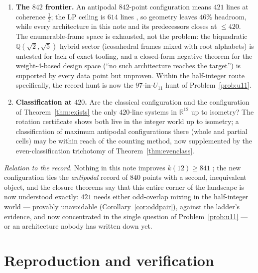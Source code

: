 \documentclass[11pt]{article}
\theoremstyle{remark}
\newcommand{\RR}{\mathbb{R}}
\newcommand{\QQ}{\mathbb{Q}}
\begin{document}
\begin{enumerate}
relaxation adapted to the $64$-per-cell-pair conflict structure that beats
the gaps of Table~\ref{tab:loose}? The barrier theorem sharpens the
question: any useful valid-inequality family must have $\ge110$-cell
positive support. The twelve star cuts are the first such family; finding
a \emph{second}, independent one (weighted stars? spectral cuts on the
$U_{11}$ quotient?) would over-determine the polytope near the witness and
might close the gap without solving Problem~\ref{prob:u11} exactly.
\item \textbf{The $842$ frontier.} An antipodal $842$-point configuration
means $421$ lines at coherence $\tfrac12$; the LP ceiling is $614$ lines
\cite{RussellLines26}, so geometry leaves $46\%$ headroom, while every
architecture in this note and its predecessors closes at $\le420$. The
enumerable-frame space is exhausted, not the problem: the biquadratic
$\QQ(\sqrt2,\sqrt5)$ hybrid sector (icosahedral frames mixed with root
alphabets) is untested for lack of exact tooling, and a closed-form
negative theorem for the weight-$4$-based design space (``no such
architecture reaches the target'') is supported by every data point but
unproven. Within the half-integer route specifically, the record hunt is
now the $97$-in-$U_{11}$ hunt of Problem~\ref{prob:u11}.
\item \textbf{Classification at $420$.} Are the classical configuration
and the configuration of Theorem~\ref{thm:exists} the only $420$-line
systems in $\RR^{12}$ up to isometry? The rotation certificate shows both
live in the integer world up to isometry; a classification of maximum
antipodal configurations there (whole and partial cells) may be within
reach of the counting method, now supplemented by the even-classification
trichotomy of Theorem~\ref{thm:evenclass}.
\end{enumerate}

\emph{Relation to the record.} Nothing in this note improves $k(12)\ge841$
\cite{TAY26}; the new configuration ties the \emph{antipodal} record of
$840$ points with a second, inequivalent object, and the closure theorems
say that this entire corner of the landscape is now understood exactly:
$421$ needs either odd-overlap mixing in the half-integer world ---
provably unavoidable (Corollary~\ref{cor:oddpair}), against the ladder's
evidence, and now concentrated in the single question of
Problem~\ref{prob:u11} --- or an architecture nobody has written down
yet.

\appendix

\section{Reproduction and verification}\label{sec:repro}
\end{document}
